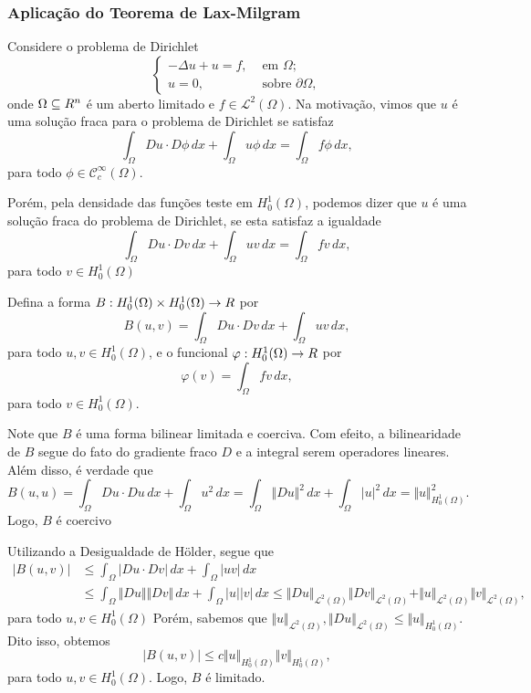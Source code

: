 \documentclass[xcolor=dvipsnames, aspectratio=169, 10pt]{beamer}
\let\mathbb\relax
\newcommand{\bR}{\mathbb{R}}
\newcommand{\cC}{\mathcal{C}}
\newcommand{\cL}{\mathcal{L}}
\begin{document}
\begin{frame}
    \frametitle{Aplicação do Teorema de Lax-Milgram}
    Considere o problema de Dirichlet
\begin{equation} \label{eq:problema-de-dirichlet}
    \left\{
    \begin{aligned}
        -\Delta u + u = f, &\text{ em } \Omega;\\
        u = 0, &\text{ sobre } \partial\Omega,
    \end{aligned}
    \right.
\end{equation}
onde $\Omega \subseteq \bR^n$ é um aberto limitado e $f \in \cL^2(\Omega)$.
Na motivação, vimos que $u$ é uma solução fraca para o problema de Dirichlet se satisfaz
\[
    \int_\Omega Du \cdot D\phi \,dx + \int_\Omega u\phi \,dx = \int_\Omega f\phi \,dx,
\]
para todo $\phi \in \cC^{\infty}_c(\Omega)$.
\end{frame}
\begin{frame}
    Porém, pela densidade das funções teste em $H^{1}_0(\Omega)$, podemos dizer que $u$ é uma solução fraca do problema de Dirichlet, se esta satisfaz a igualdade
\[
    \int_\Omega Du \cdot Dv \,dx + \int_\Omega uv \,dx = \int_\Omega fv \,dx,
\]
para todo $v \in H_0^1(\Omega)$
\end{frame}
\begin{frame}
    Defina a forma $B : H^1_0(\Omega) \times H^1_0(\Omega) \to \bR$ por
\[
    B(u,v)=\int_\Omega Du \cdot Dv \,dx + \int_{\Omega} uv \,dx,
\]
para todo $u, v \in H^1_0(\Omega)$,
e o funcional $\varphi : H^1_0(\Omega) \to \bR$ por
\[
    \varphi(v) = \int_\Omega fv \,dx,
\]
para todo $v \in H^1_0(\Omega)$.
\end{frame}
\begin{frame}
    Note que $B$ é uma forma bilinear limitada e coerciva. Com efeito, a bilinearidade de $B$ segue do fato do gradiente fraco $D$ e a integral serem operadores lineares. Além disso, é verdade que
\[
    B(u,u) = \int_\Omega Du \cdot Du \,dx + \int_\Omega u^2 \,dx
    = \int_\Omega \Vert Du \Vert^2 \,dx + \int_\Omega |u|^2 \,dx 
    = \Vert u \Vert_{H^1_0(\Omega)}^2.
\]
Logo, $B$ é coercivo
\end{frame}
\begin{frame}
    Utilizando a Desigualdade de Hölder, segue que
\[
    \begin{aligned}
        |B(u,v)| &\leqslant \int_\Omega |Du \cdot Dv | \,dx + \int_\Omega |u v | \,dx\\ &\leqslant \int_\Omega \Vert Du \Vert \Vert Dv \Vert \,dx + \int_\Omega |u| |v| \,dx \leqslant \Vert Du \Vert_{\cL^2(\Omega)}\Vert Dv \Vert_{\cL^2(\Omega)} + \Vert u \Vert_{\cL^2(\Omega)}\Vert v \Vert_{\cL^2(\Omega)},
    \end{aligned}
\]
para todo $u, v \in H^1_0(\Omega)$
Porém, sabemos que $\Vert u \Vert_{\cL^2(\Omega)}, \Vert Du \Vert_{\cL^2(\Omega)} \leqslant \Vert u \Vert_{H^1_0(\Omega)}$.
Dito isso, obtemos
\[
    |B(u,v)| \leqslant c \Vert u \Vert_{H^1_0(\Omega)} \Vert v \Vert_{H^1_0(\Omega)},
\]
para todo $u, v \in H^1_0(\Omega)$. Logo, $B$ é limitado.
\end{frame}
\end{document}
